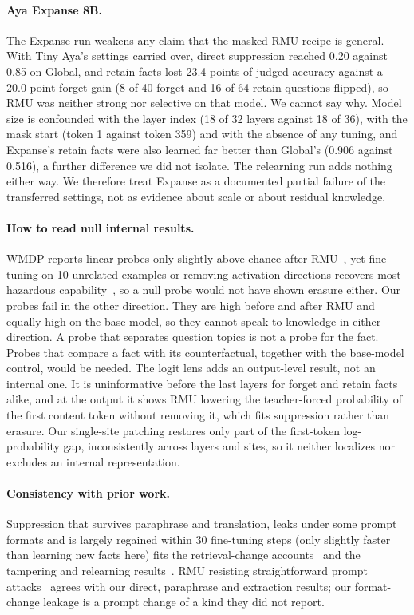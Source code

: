 \documentclass[10pt,twocolumn]{article}
\begin{document}
\paragraph{Aya Expanse 8B.} The Expanse run weakens any claim that the masked-RMU recipe is general. With Tiny Aya's settings carried over, direct suppression reached 0.20 against 0.85 on Global, and retain facts lost 23.4 points of judged accuracy against a 20.0-point forget gain (8 of 40 forget and 16 of 64 retain questions flipped), so RMU was neither strong nor selective on that model. We cannot say why. Model size is confounded with the layer index (18 of 32 layers against 18 of 36), with the mask start (token 1 against token 359) and with the absence of any tuning, and Expanse's retain facts were also learned far better than Global's (0.906 against 0.516), a further difference we did not isolate. The relearning run adds nothing either way. We therefore treat Expanse as a documented partial failure of the transferred settings, not as evidence about scale or about residual knowledge.

\paragraph{How to read null internal results.} WMDP reports linear probes only slightly above chance after RMU~\cite{li2024wmdp}, yet fine-tuning on 10 unrelated examples or removing activation directions recovers most hazardous capability~\cite{lucki2024adversarial}, so a null probe would not have shown erasure either. Our probes fail in the other direction. They are high before and after RMU and equally high on the base model, so they cannot speak to knowledge in either direction. A probe that separates question topics is not a probe for the fact. Probes that compare a fact with its counterfactual, together with the base-model control, would be needed. The logit lens adds an output-level result, not an internal one. It is uninformative before the last layers for forget and retain facts alike, and at the output it shows RMU lowering the teacher-forced probability of the first content token without removing it, which fits suppression rather than erasure. Our single-site patching restores only part of the first-token log-probability gap, inconsistently across layers and sites, so it neither localizes nor excludes an internal representation.

\paragraph{Consistency with prior work.} Suppression that survives paraphrase and translation, leaks under some prompt formats and is largely regained within 30 fine-tuning steps (only slightly faster than learning new facts here) fits the retrieval-change accounts~\cite{hong2024conceptvectors,hong2024dissecting} and the tampering and relearning results~\cite{che2025tampering,hu2024jogging}. RMU resisting straightforward prompt attacks~\cite{jang2025prompt} agrees with our direct, paraphrase and extraction results; our format-change leakage is a prompt change of a kind they did not report.
\end{document}

